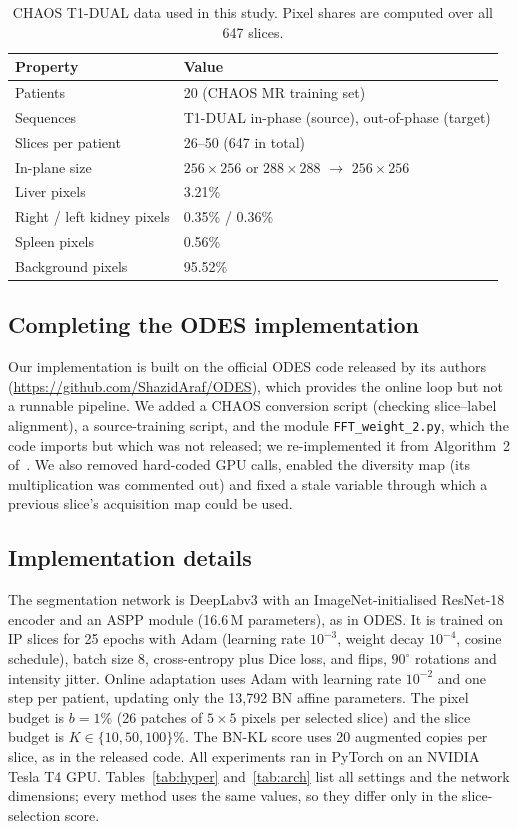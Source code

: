 \documentclass[a4paper,fleqn]{cas-dc}
\begin{document}
\begin{table}[!htbp]
\caption{CHAOS T1-DUAL data used in this study. Pixel shares are computed over all 647 slices.}
\label{tab:data}
\centering\footnotesize
\begin{tabular}{@{}p{}p{}@{}}
\toprule
Property & Value \\
\midrule
Patients & 20 (CHAOS MR training set) \\
Sequences & T1-DUAL in-phase (source), out-of-phase (target) \\
Slices per patient & 26--50 (647 in total) \\
In-plane size & $256\times256$ or $288\times288$ $\rightarrow$ $256\times256$ \\
Liver pixels & 3.21\% \\
Right / left kidney pixels & 0.35\% / 0.36\% \\
Spleen pixels & 0.56\% \\
Background pixels & 95.52\% \\
\bottomrule
\end{tabular}
\end{table}

\subsection{Completing the ODES implementation}
Our implementation is built on the official ODES code released by its authors (\url{https://github.com/ShazidAraf/ODES}), which provides the online loop but not a runnable pipeline. We added a CHAOS conversion script (checking slice--label alignment), a source-training script, and the module \texttt{FFT\_weight\_2.py}, which the code imports but which was not released; we re-implemented it from Algorithm~2 of~\cite{islam2025odes}. We also removed hard-coded GPU calls, enabled the diversity map (its multiplication was commented out) and fixed a stale variable through which a previous slice's acquisition map could be used.

\subsection{Implementation details}
The segmentation network is DeepLabv3 with an ImageNet-initialised ResNet-18 encoder and an ASPP module (16.6\,M parameters), as in ODES. It is trained on IP slices for 25 epochs with Adam (learning rate $10^{-3}$, weight decay $10^{-4}$, cosine schedule), batch size 8, cross-entropy plus Dice loss, and flips, $90^\circ$ rotations and intensity jitter. Online adaptation uses Adam with learning rate $10^{-2}$ and one step per patient, updating only the 13{,}792 BN affine parameters. The pixel budget is $b=1\%$ (26 patches of $5\times5$ pixels per selected slice) and the slice budget is $K\in\{10,50,100\}\%$. The BN-KL score uses 20 augmented copies per slice, as in the released code. All experiments ran in PyTorch on an NVIDIA Tesla T4 GPU. Tables~\ref{tab:hyper} and~\ref{tab:arch} list all settings and the network dimensions; every method uses the same values, so they differ only in the slice-selection score.
\end{document}
